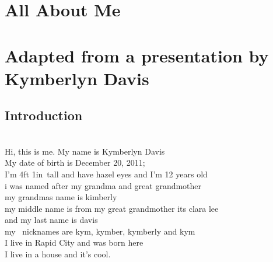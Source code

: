 \documentclass[10pt]{report}
\newcommand{\fbd}{
    \setlength{\fboxsep}{0pt}
    \setlength{\fboxrule}{3pt}
  }
\begin{document}
\chapter*{%
  \huge All About Me\\
  \small \;\\Adapted from a presentation by Kymberlyn Davis
}
\section*{Introduction}{%
  \fbd
  }
\;\\
Hi, this is me. My name is Kymberlyn Davis\\
My date of birth is December 20, 2011;\\
I'm 4ft 1in tall and have hazel eyes and I'm 12 years old\\
i was named after my grandma and great grandmother\\
my grandmas name is kimberly\\
my middle name is from my great grandmother its clara lee\\
and my last name is davis \\
my  nicknames are kym, kymber, kymberly and kym\\
I live in Rapid City and was born here\\
I live in a house and it's cool.
\clearpage
\end{document}
